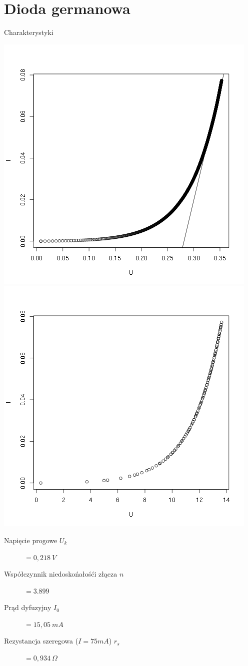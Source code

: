 \documentclass[11pt]{article}
\begin{document}
\section{Dioda germanowa}
Charakterystyki 
\begin{center}
\includegraphics[scale=0.48]{out/germanowa-normal.png}
\includegraphics[scale=0.48]{out/germanowa-log.png}
\end{center}
\begin{description}
\item[Napięcie progowe $U_k$] $=0,218\ V$
\item[Współczynnik niedoskońałośći złącza $n$]  $=3.899$
\item[Prąd dyfuzyjny $I_0$ ] $=15,05\ mA$
\item[Rezystancja szeregowa ($I=75mA$) $r_s$ ] $=0,934\ \Omega$
\end{description}
\end{document}
